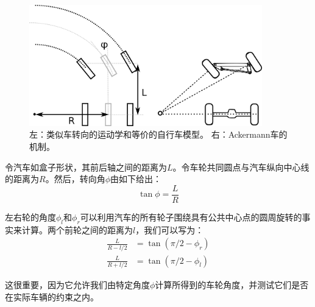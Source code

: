 \begin{figure}[htb!]
	\centering
		\includegraphics[width=0.9\textwidth]{figs/ackermann.png}
	\caption {左：类似车转向的运动学和等价的自行车模型。 右：Ackermann车的机制。}
	\label{fig:ackermann}
\end{figure}


令汽车如盒子形状，其前后轴之间的距离为$L$。令车轮共同圆点与汽车纵向中心线的距离为$R$。然后，转向角$\phi$由如下给出：
\begin{equation}\label{eq:ackermann}
\tan \phi = \frac{L}{R}
\end{equation}


左右轮的角度$\phi_l$和$\phi_r$可以利用汽车的所有轮子围绕具有公共中心点的圆周旋转的事实来计算。两个前轮之间的距离为$l$，我们可以写为：
\begin{eqnarray}
\frac{L}{R-l/2}&=\tan{(\pi/2-\phi_r)}\\
\frac{L}{R+l/2}&=\tan{(\pi/2-\phi_l)}
\end{eqnarray}

这很重要，因为它允许我们由特定角度$\phi$计算所得到的车轮角度，并测试它们是否在实际车辆的约束之内。

